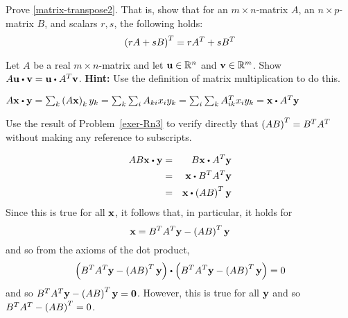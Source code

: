 \begin{enumialphparenastyle}
\begin{ex} Prove {\eqref{matrix-transpose2}}. That is, show that for an $m \times n$-matrix $A$, an $n \times p$-matrix $B$, and scalars $r, s$, the following holds:
\[
\left(rA + sB\right) ^T = rA^{T} + sB^{T}
\]
\end{ex}

\begin{ex} \label{exer-Rn3}  Let $A$ be a real $m\times n$-matrix and
let $\mbox{\bf u}\in \mathbb{R}^{n}$ and $\mbox{\bf v}\in \mathbb{R}^{m}$. Show 
$A\vect{u}\dotprod \vect{v}=\vect{u}\dotprod A^{T}\vect{v}$. 
\textbf{Hint:} Use the definition of matrix
multiplication to do this.
\begin{sol}
$A\vect{x}\dotprod \vect{y}=\sum_{k}\tup{A\vect{x}
} _{k}y_{k}=\sum_{k}\sum_{i}A_{ki}x_{i}y_{k}=\sum_{i}
\sum_{k}A_{ik}^{T}x_{i}y_{k}= \vect{x} \dotprod A^{T}\vect{y} $
\end{sol}
\end{ex}

\begin{ex} Use the result of Problem~\ref{exer-Rn3} to verify directly
that $\left(AB\right) ^{T}=B^{T}A^{T}$ without making any reference to
subscripts.
\begin{sol}
\begin{eqnarray*}
 AB\vect{x} \dotprod \vect{y} &=& B\vect{x} \dotprod A^{T}\vect{y} \\ 
&=& \vect{x}\dotprod B^{T}A^{T}\vect{y} \\
&=& \vect{x}\dotprod \tup{AB} ^{T} \vect{y}
\end{eqnarray*}
Since this is true for all $\mbox{\bf x}$, it follows that, in particular, it
holds for
\[
\mbox{\bf x}=B^{T}A^{T}\mbox{\bf y}-\left(AB\right) ^{T}\mbox{\bf y}
\]
and so from the axioms of the dot product,
\[
\tup{B^{T}A^{T}\vect{y}-\tup{AB} ^{T}\vect{y}} \dotprod \tup{B^{T}A^{T}
\vect{y}-\tup{AB} ^{T}\vect{y}} =0
\]
and so $B^{T}A^{T}\mbox{\bf y}-\left(AB\right) ^{T}\mbox{\bf y}=\mbox{\bf 0}$. However,
this is true for all $\mbox{\bf y}$ and so $B^{T}A^{T}-\left(
AB\right) ^{T}=0$.
\end{sol}
\end{ex}
 
\end{enumialphparenastyle}
